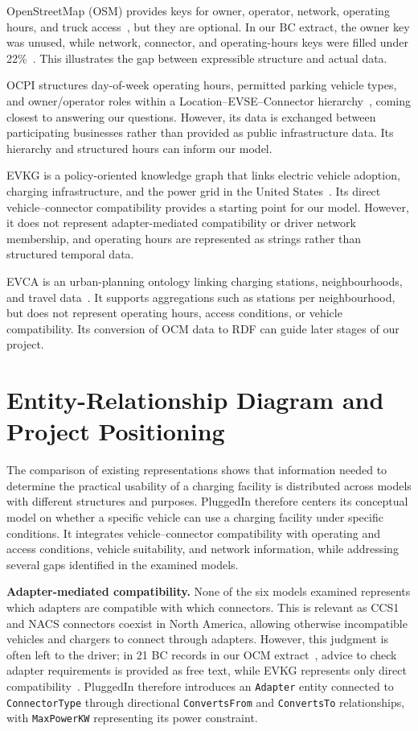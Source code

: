 \documentclass[sigconf]{acmart}
\begin{document}
OpenStreetMap (OSM) provides keys for owner, operator, network, operating hours, and truck access~\cite{osm}, but they are optional. In our BC extract, the owner key was unused, while network, connector, and operating-hours keys were filled under 22\%~\cite{osm_data}. This illustrates the gap between expressible structure and actual data.

OCPI structures day-of-week operating hours, permitted parking vehicle types, and owner/operator roles within a Location--EVSE--Connector hierarchy~\cite{ocpi}, coming closest to answering our questions. However, its data is exchanged between participating businesses rather than provided as public infrastructure data. Its hierarchy and structured hours can inform our model.

EVKG is a policy-oriented knowledge graph that links electric vehicle adoption, charging infrastructure, and the power grid in the United States~\cite{evkg}. Its direct vehicle--connector compatibility provides a starting point for our model. However, it does not represent adapter-mediated compatibility or driver network membership, and operating hours are represented as strings rather than structured temporal data.

EVCA is an urban-planning ontology linking charging stations, neighbourhoods, and travel data~\cite{evca}. It supports aggregations such as stations per neighbourhood, but does not represent operating hours, access conditions, or vehicle compatibility. Its conversion of OCM data to RDF can guide later stages of our project.


\section{Entity-Relationship Diagram and Project Positioning}
The comparison of existing representations shows that information needed to determine the practical usability of a charging facility is distributed across models with different structures and purposes. PluggedIn therefore centers its conceptual model on whether a specific vehicle can use a charging facility under specific conditions. It integrates vehicle--connector compatibility with operating and access conditions, vehicle suitability, and network information, while addressing several gaps identified in the examined models.

\textbf{Adapter-mediated compatibility.} None of the six models examined represents which adapters are compatible with which connectors. This is relevant as CCS1 and NACS connectors coexist in North America, allowing otherwise incompatible vehicles and chargers to connect through adapters. However, this judgment is often left to the driver; in 21 BC records in our OCM extract~\cite{ocm}, advice to check adapter requirements is provided as free text, while EVKG represents only direct compatibility~\cite{evkg}. PluggedIn therefore introduces an \texttt{Adapter} entity connected to \texttt{ConnectorType} through directional \texttt{ConvertsFrom} and \texttt{ConvertsTo} relationships, with \texttt{MaxPowerKW} representing its power constraint.
\end{document}
